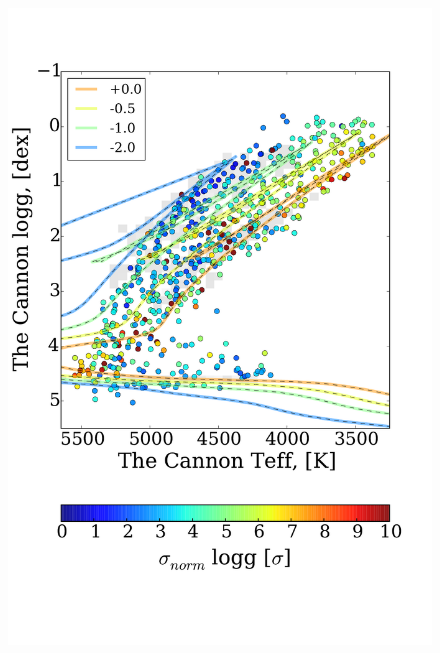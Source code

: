 \documentclass[12pt, preprint]{aastex}
\begin{document}
\begin{figure}[!h]
    \includegraphics[scale=0.26]{./plots/aftersubmit/stdtest_g_normed.pdf}

\end{figure}
\end{document}
